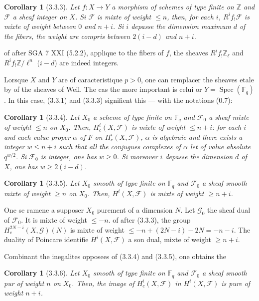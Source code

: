 \documentclass[12pt,a4paper]{article}
\theoremstyle{plain}
\newtheorem{corollary}[theorem]{Corollary}
\theoremstyle{definition}
\theoremstyle{remark}
\DeclareMathOperator{\Spec}{Spec}
\newcommand{\FF}{{\mathbb{F}}}
\newcommand{\ZZ}{{\mathbb{Z}}}
\begin{document}
\begin{corollary}[3.3.3]
Let $f : X \to Y$ a morphism of schemes of type finite on $\ZZ$ and $\mathscr{F}$ a sheaf integer on $X$. Si $\mathscr{F}$ is mixte of weight $\leq n$, then, for each $i$, $R^i f_! \mathscr{F}$ is mixte of weight between $0$ and $n + i$. Si $i$ depasse the dimension maximum $d$ of the fibers, the weight are compris between $2(i-d)$ and $n + i$.
\end{corollary}

of after SGA 7 XXI (5.2.2), applique to the fibers of $f$, the sheaves $R^i f_! \ZZ_\ell$ and $R^i f_! \ZZ/\ell^n$ ($i - d$) are indeed integers.

Lorsque $X$ and $Y$ are of caracteristique $p > 0$, one can remplacer the sheaves etale by of the sheaves of Weil. The cas the more important is celui or $Y = \Spec(\FF_q)$. In this case, (3.3.1) and (3.3.3) signifient this --- with the notations (0.7):

\begin{corollary}[3.3.4]
Let $X_0$ a scheme of type finite on $\FF_q$ and $\mathscr{F}_0$ a sheaf mixte of weight $\leq n$ on $X_0$. Then, $H_c^i(X, \mathscr{F})$ is mixte of weight $\leq n + i$: for each $i$ and each value proper $\alpha$ of $F$ on $H_c^i(X, \mathscr{F})$, $\alpha$ is algebraic and there exists a integer $w \leq n + i$ such that all the conjugues complexes of $\alpha$ let of value absolute $q^{w/2}$. Si $\mathscr{F}_0$ is integer, one has $w \geq 0$. Si moreover $i$ depasse the dimension $d$ of $X$, one has $w \geq 2(i-d)$.
\end{corollary}

\begin{corollary}[3.3.5]
Let $X_0$ smooth of type finite on $\FF_q$ and $\mathscr{F}_0$ a sheaf smooth mixte of weight $\geq n$ on $X_0$. Then, $H^i(X, \mathscr{F})$ is mixte of weight $\geq n + i$.
\end{corollary}

One se ramene a supposer $X_0$ purement of a dimension $N$. Let $\mathscr{G}_0$ the sheaf dual of $\mathscr{F}_0$. It is mixte of weight $\leq -n$. of after (3.3.3), the group $H_c^{2N-i}(X, \mathscr{G})(N)$ is mixte of weight $\leq -n + (2N-i) - 2N = -n - i$. The duality of Poincare identifie $H^i(X, \mathscr{F})$ a son dual, mixte of weight $\geq n + i$.

Combinant the inegalites opposees of (3.3.4) and (3.3.5), one obtains the

\begin{corollary}[3.3.6]
Let $X_0$ smooth of type finite on $\FF_q$ and $\mathscr{F}_0$ a sheaf smooth pur of weight $n$ on $X_0$. Then, the image of $H_c^i(X, \mathscr{F})$ in $H^i(X, \mathscr{F})$ is pure of weight $n + i$.
\end{corollary}
\end{document}
